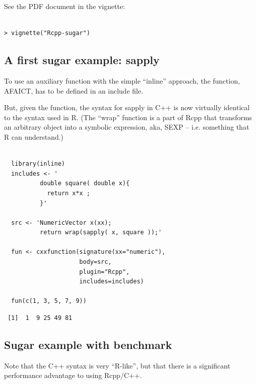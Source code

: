 \documentclass[11pt]{article}
\begin{document}
See the PDF document in the vignette:


\begin{verbatim}

> vignette("Rcpp-sugar")
\end{verbatim}
\subsection{A first sugar example: sapply}
\label{sec-9-1}


To use an auxiliary function with the simple ``inline'' approach, the
function, AFAICT, has to be defined in an include file.

But, given the function, the syntax for sapply in C++  is now virtually
identical to the syntax used in R.  (The ``wrap'' function is a part of
Rcpp that transforms an arbitrary object into a symbolic expression,
aka, SEXP -- i.e. something that R can understand.)


\begin{verbatim}
  
  library(inline)
  includes <- '
          double square( double x){
            return x*x ;
          }'
  
  src <- 'NumericVector x(xx);
          return wrap(sapply( x, square ));'
  
  fun <- cxxfunction(signature(xx="numeric"),
                     body=src,
                     plugin="Rcpp",
                     includes=includes)
  
  fun(c(1, 3, 5, 7, 9))
\end{verbatim}

\begin{verbatim}
 [1]  1  9 25 49 81
\end{verbatim}
\subsection{Sugar example with benchmark}
\label{sec-9-2}


Note that the C++ syntax is very ``R-like'', but that there is a
significant performance advantage to using Rcpp/C++.
\end{document}
